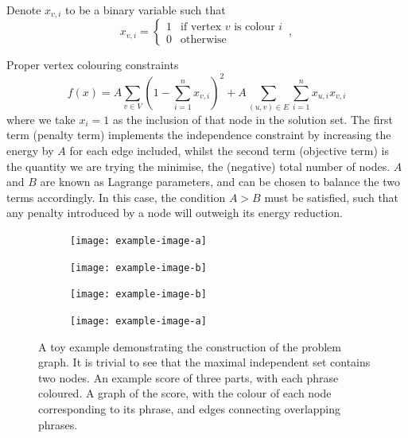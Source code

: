 \documentclass[12pt]{article}
\begin{document}
Denote $x_{v,i}$ to be a binary variable such that
\begin{equation}
    x_{v,i} =
    \begin{cases}
        1 & \text{if vertex $v$ is colour $i$} \\
        0 & \text{otherwise}
    \end{cases}
    \,,
\end{equation}

Proper vertex colouring constraints
\begin{equation}
    f(x)=A\sum_{v \in V}\left(1-\sum_{i=1}^{n} x_{v,i}\right)^2+A\sum_{(u,v) \in E}\sum_{i=1}^n x_{u,i}x_{v,i}
    \label{eq:MIS}
\end{equation}
where we take $x_i=1$ as the inclusion of that node in the solution set. The first term (penalty term) implements the independence constraint by increasing the energy by $A$ for each edge included, whilst the second term (objective term) is the quantity we are trying the minimise, the (negative) total number of nodes. $A$ and $B$ are known as Lagrange parameters, and can be chosen to balance the two terms accordingly. In this case, the condition $A>B$ must be satisfied, such that any penalty introduced by a node will outweigh its energy reduction.

\begin{figure}
    \begin{subfigure}{0.5\textwidth}
        \texttt{[image: example-image-a]}
        \caption{}
        \label{fig:simple-excerpt}
    \end{subfigure}\hfill
    \begin{subfigure}{0.5\textwidth}
        \texttt{[image: example-image-b]}
        \caption{}
        \label{fig:simple-graph}
    \end{subfigure}
    \begin{subfigure}{0.5\textwidth}
        \texttt{[image: example-image-b]}
        \caption{}
        \label{fig:example-a}
    \end{subfigure}\hfill
    \begin{subfigure}{0.5\textwidth}
        \texttt{[image: example-image-a]}
        \caption{}
        \label{fig:example-b}
    \end{subfigure}

    \caption{A toy example demonstrating the construction of the problem graph. It is trivial to see that the maximal independent set contains two nodes.  An example score of three parts, with each phrase coloured.  A graph of the score, with the colour of each node corresponding to its phrase, and edges connecting overlapping phrases.}
    \label{fig:toy}
\end{figure}
\end{document}
